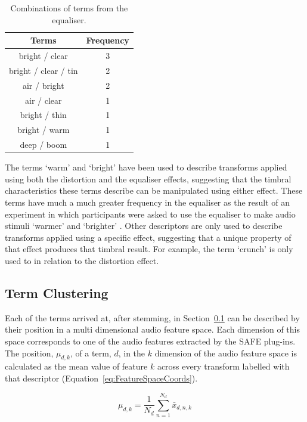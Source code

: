 		\begin{table}[h!]
			\centering
			\begin{tabular}{|c|c|}
				\hline
				\bf{Terms} & \bf{Frequency} \tabularnewline
				\hline
				\hline
				bright / clear & 3 \tabularnewline
				\hline
				bright / clear / tin & 2 \tabularnewline
				\hline
				air / bright & 2 \tabularnewline
				\hline
				air / clear & 1 \tabularnewline
				\hline
				bright / thin & 1 \tabularnewline
				\hline
				bright / warm & 1 \tabularnewline
				\hline
				deep / boom & 1 \tabularnewline
				\hline
			\end{tabular}
			\caption{Combinations of terms from the equaliser.}
			\label{tab:EqualiserTermCombinations}
		\end{table}

		The terms `warm' and `bright' have been used to describe transforms applied using both the distortion and
		the equaliser effects, suggesting that the timbral characteristics these terms describe can be manipulated
		using either effect. These terms have much a much greater frequency in the equaliser as the result of an
		experiment in which participants were asked to use the equaliser to make audio stimuli `warmer' and
		`brighter' \citep{stasis2015a}. Other descriptors are only used to describe transforms applied using a
		specific effect, suggesting that a unique property of that effect produces that timbral result. For
		example, the term `crunch' is only used to in relation to the distortion effect.

	\subsection{Term Clustering}
	\label{sec:TimbreEvaluation-Analysis-TermClustering}
		Each of the terms arrived at, after stemming, in Section~\ref{sec:TimbreEvaluation-Analysis-TermClustering}
		can be described by their position in a multi dimensional audio feature space. Each dimension of this space
		corresponds to one of the audio features extracted by the SAFE plug-ins. The position, $\mu_{d,k}$, of a
		term, $d$, in the $k$ dimension of the audio feature space is calculated as the mean value of
		feature $k$ across every transform labelled with that descriptor (Equation~\ref{eq:FeatureSpaceCoords}).

		\begin{equation}
			\mu_{d,k} = \frac{1}{N_{d}} \sum_{n = 1}^{N_{d}} \bar{x}_{d,n,k}
			\label{eq:FeatureSpaceCoords}
		\end{equation}

